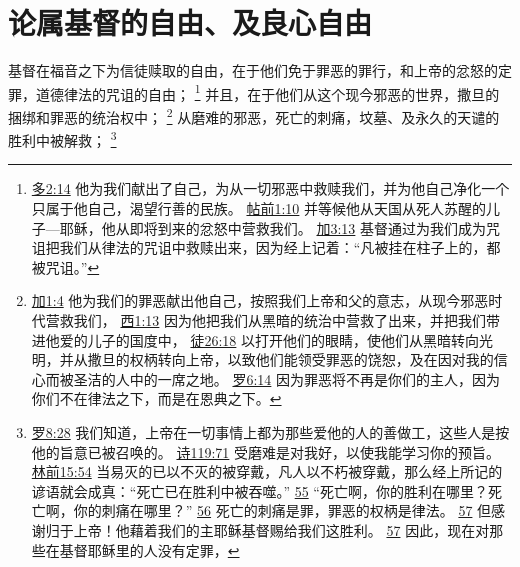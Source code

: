 \documentclass[12pt, a4paper, oneside]{ctexart}
\newcounter{parnum}[section]
\newcommand{\N}{%
   \noindent\refstepcounter{parnum}%
    \makebox[\parindent][l]{\textbf{\arabic{parnum}.}}}
\begin{document}
\section{论属基督的自由、及良心自由}

\N 基督在福音之下为信徒赎取的自由，在于他们免于罪恶的罪行，和上帝的忿怒的定罪，道德律法的咒诅的自由；
	\footnote {
		\href{https://biblehub.com/titus/2-14.htm}{多2:14} 他为我们献出了自己，为从一切邪恶中救赎我们，并为他自己净化一个只属于他自己，渴望行善的民族。
		\href{https://biblehub.com/1_thessalonians/1-10.htm}{帖前1:10} 并等候他从天国从死人苏醒的儿子---耶稣，他从即将到来的忿怒中营救我们。
		\href{https://biblehub.com/galatians/3-13.htm}{加3:13} 基督通过为我们成为咒诅把我们从律法的咒诅中救赎出来，因为经上记着：“凡被挂在柱子上的，都被咒诅。”
	}
	并且，在于他们从这个现今邪恶的世界，撒旦的捆绑和罪恶的统治权中；
	\footnote {
		\href{https://biblehub.com/galatians/1-4.htm}{加1:4} 他为我们的罪恶献出他自己，按照我们上帝和父的意志，从现今邪恶时代营救我们，
		\href{https://biblehub.com/colossians/1-13.htm}{西1:13} 因为他把我们从黑暗的统治中营救了出来，并把我们带进他爱的儿子的国度中，
		\href{https://biblehub.com/acts/26-18.htm}{徒26:18} 以打开他们的眼睛，使他们从黑暗转向光明，并从撒旦的权柄转向上帝，以致他们能领受罪恶的饶恕，及在因对我的信心而被圣洁的人中的一席之地。
		\href{https://biblehub.com/romans/6-14.htm}{罗6:14} 因为罪恶将不再是你们的主人，因为你们不在律法之下，而是在恩典之下。
	}
	从磨难的邪恶，死亡的刺痛，坟墓、及永久的天谴的胜利中被解救；
	\footnote {
		\href{https://biblehub.com/romans/8-28.htm}{罗8:28} 我们知道，上帝在一切事情上都为那些爱他的人的善做工，这些人是按他的旨意已被召唤的。
		\href{https://biblehub.com/psalms/119-71.htm}{诗119:71} 受磨难是对我好，以使我能学习你的预旨。
		\href{https://biblehub.com/1_corinthians/15-54.htm}{林前15:54} 当易灭的已以不灭的被穿戴，凡人以不朽被穿戴，那么经上所记的谚语就会成真：“死亡已在胜利中被吞噬。”
		\href{https://biblehub.com/1_corinthians/15-55.htm}{55} “死亡啊，你的胜利在哪里？死亡啊，你的刺痛在哪里？”
		\href{https://biblehub.com/1_corinthians/15-56.htm}{56} 死亡的刺痛是罪，罪恶的权柄是律法。
		\href{https://biblehub.com/1_corinthians/15-57.htm}{57} 但感谢归于上帝！他藉着我们的主耶稣基督赐给我们这胜利。
		\href{https://biblehub.com/romans/8-1.htm}{57} 因此，现在对那些在基督耶稣里的人没有定罪，
	}
\end{document}
